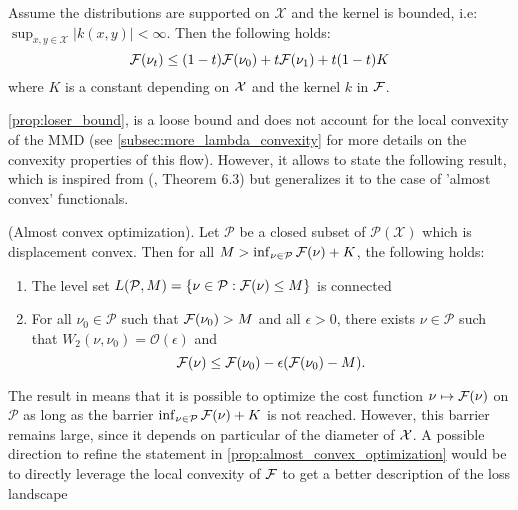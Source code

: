 \begin{proposition}
	\label{prop:loser_bound}Assume the distributions are supported on
	$\mathcal{X}$ and the kernel is bounded, i.e: $\sup_{x,y\in\mathcal{X}}\vert k(x,y)\vert<\infty$.
	Then the following holds:
	\begin{equation}
	{{\mathcal F}}(\nu_{t})\leq(1-t){{\mathcal F}}(\nu_{0})+t{{\mathcal F}}(\nu_{1})+t(1-t)K
	\end{equation}
	where $K$ is a constant depending on ${{\mathcal X}}$ and the kernel $k$ in ${{\mathcal F}}$.
\end{proposition}
%
%
\cref{prop:loser_bound}, is a loose bound and does not account for the local
convexity of the MMD (see \cref{subsec:more_lambda_convexity} for more details on the convexity properties of this flow). However, it allows to state the following result,
which is inspired from (\cite{Bottou:2017}, Theorem 6.3) but generalizes
it to the case of 'almost convex' functionals.
\begin{proposition}
	\label{prop:almost_convex_optimization}
	(Almost convex optimization). Let $\mathcal{P}$ be a closed subset
	of $\mathcal{P}(\mathcal{X})$ which is displacement convex. Then
	for all $M>\inf_{\nu\in\mathcal{P}}{{\mathcal F}}(\nu)+K$, the following
	holds:
\end{proposition}
\begin{enumerate}
	\item The level set $L(\mathcal{P},M)=\{\nu\in\mathcal{P}:{{\mathcal F}}(\nu)\leq M\}$
	is connected
	\item For all $\nu_{0}\in\mathcal{P}$ such that ${{\mathcal F}}(\nu_0)>M$
	and all $\epsilon>0$, there exists $\nu\in\mathcal{P}$ such that
	$W_{2}(\nu,\nu_{0})=\mathcal{O}(\epsilon)$ and
	\[
	{{\mathcal F}}(\nu)\leq {{\mathcal F}}(\nu_{0})-\epsilon({{\mathcal F}}(\nu_{0})-M).
	\]
\end{enumerate}
%
The result in  means that it is possible to optimize the cost function $\nu\mapsto {{\mathcal F}}(\nu)$
on $\mathcal{P}$ as long as the barrier $\inf_{\nu\in\mathcal{P}}{{\mathcal F}}(\nu)+K$
is not reached. However, this barrier remains large, since it depends on particular of the diameter of ${{\mathcal X}}$. A possible direction to refine the statement in \cref{prop:almost_convex_optimization} would be to directly leverage the local convexity of ${{\mathcal F}}$ to get a better description of the loss landscape


